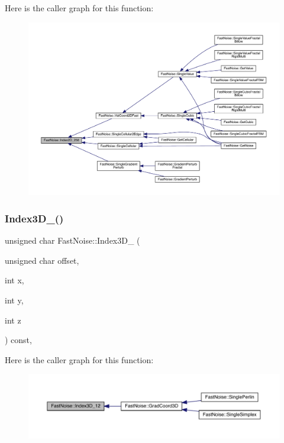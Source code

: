 Here is the caller graph for this function\+:
\nopagebreak
\begin{figure}[H]
\begin{center}
\leavevmode
\includegraphics[width=350pt]{d1/dd8/class_fast_noise_aec59eb9f9bcdb06e6a7dbe5a3fdf7145_icgraph}
\end{center}
\end{figure}
\mbox{\label{class_fast_noise_ab4304e7e7b79684b371492d3c7f0aa51}} 
\subsubsection{\texorpdfstring{Index3\+D\+\_()}{Index3D\_12()}}
{\footnotesize\ttfamily unsigned char Fast\+Noise\+::\+Index3\+D\+\_ (\begin{DoxyParamCaption}\item[{unsigned char}]{offset,  }\item[{int}]{x,  }\item[{int}]{y,  }\item[{int}]{z }\end{DoxyParamCaption}) const\hspace{0.3cm}{\ttfamily [inline]}, {\ttfamily [private]}}

Here is the caller graph for this function\+:
\nopagebreak
\begin{figure}[H]
\begin{center}
\leavevmode
\includegraphics[width=350pt]{d1/dd8/class_fast_noise_ab4304e7e7b79684b371492d3c7f0aa51_icgraph}
\end{center}
\end{figure}
\mbox{\label{class_fast_noise_a1102de0e643266c5ea9b54a5bbca2476}} 
